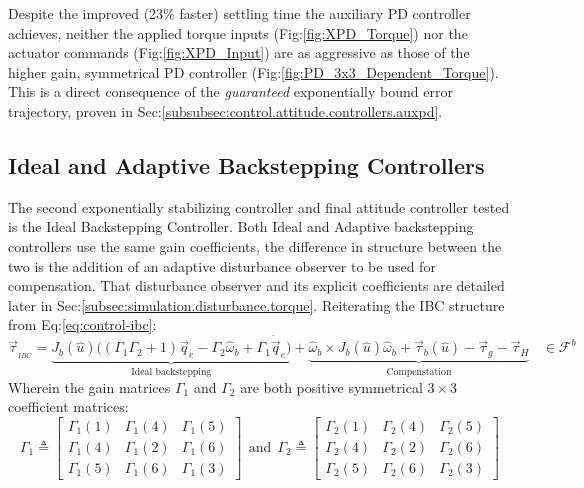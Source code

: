 Despite the improved (23\% faster) settling time the auxiliary PD controller achieves, neither the applied torque inputs (Fig:\ref{fig:XPD_Torque}) nor the actuator commands (Fig:\ref{fig:XPD_Input}) are as aggressive as those of the higher gain, symmetrical PD controller (Fig:\ref{fig:PD_3x3_Dependent_Torque}). This is a direct consequence of the \emph{guaranteed} exponentially bound error trajectory, proven in Sec:\ref{subsubsec:control.attitude.controllers.auxpd}.
\subsection{Ideal and Adaptive Backstepping Controllers}
The second exponentially stabilizing controller and final attitude controller tested is the Ideal Backstepping Controller. Both Ideal and Adaptive backstepping controllers use the same gain coefficients, the difference in structure between the two is the addition of an adaptive disturbance observer to be used for compensation. That disturbance observer and its explicit coefficients are detailed later in Sec:\ref{subsec:simulation.disturbance.torque}. Reiterating the IBC structure from Eq:\ref{eq:control-ibc}:
\begin{equation}\label{eq:simulation-attitude-ibc}
\vec{\tau}_{_{IBC}}=\underbrace{J_b(\hat{u})\Big((\Gamma_1\Gamma_2+1)\vec{q}_e-\Gamma_2\hat{\omega}_b+\Gamma_1\dot{\vec{q}}_e \Big)}_{\text{Ideal backstepping}}
+\underbrace{\hat{\omega}_b\times J_b(\hat{u})\hat{\omega}_b+\vec{\tau}_b(\hat{u})-\vec{\tau}_g-\vec{\tau}_H}_{\text{Compenstation}}~~~~\in\mathcal{F}^{b}
\end{equation}
Wherein the gain matrices $\Gamma_1$ and $\Gamma_2$ are both positive symmetrical $3\times 3$ coefficient matrices:
\begin{equation}\label{eq:simulation-attitde-ibc-coefficients}
\Gamma_1\triangleq \begin{bmatrix}
\Gamma_1(1) & \Gamma_1(4) & \Gamma_1(5)\\
\Gamma_1(4) & \Gamma_1(2) & \Gamma_1(6)\\
\Gamma_1(5) & \Gamma_1(6) & \Gamma_1(3)
\end{bmatrix}
~~\text{and}~~
\Gamma_2\triangleq \begin{bmatrix}
\Gamma_2(1) & \Gamma_2(4) & \Gamma_2(5)\\
\Gamma_2(4) & \Gamma_2(2) & \Gamma_2(6)\\
\Gamma_2(5) & \Gamma_2(6) & \Gamma_2(3)
\end{bmatrix}
\end{equation}
